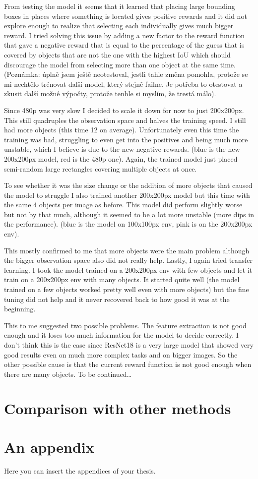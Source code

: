 \documentclass[
  digital,     %
  oneside,     %
  nosansbold,  %
  nocolorbold, %
  lof,         %
  lot,         %
]{fithesis4}
\begin{document}
From testing the model it seems that it learned that placing large bounding boxes in places where something is located gives positive rewards and it did not explore enough to realize that selecting each individually gives much bigger reward. I tried solving this issue by adding a new factor to the reward function that gave a negative reward that is equal to the percentage of the guess that is covered by objects that are not the one with the highest IoU which should discourage the model from selecting more than one object at the same time. (Poznámka: úplně jsem ještě neotestoval, jestli tahle změna pomohla, protože se mi nechtělo trénovat další model, který stejně failne. Je potřeba to otestovat a zkusit další možné výpočty, protože tenhle si myslím, že trestá málo).

Since 480p was very slow I decided to scale it down for now to just 200x200px. This still quadruples the observation space and halves the training speed. I still had more objects (this time 12 on average). Unfortunately even this time the training was bad, struggling to even get into the positives and being much more unstable, which I believe is due to the new negative rewards. (blue is the new 200x200px model, red is the 480p one). Again, the trained model just placed semi-random large rectangles covering multiple objects at once.

To see whether it was the size change or the addition of more objects that caused the model to struggle I also trained another 200x200px model but this time with the same 4 objects per image as before. This model did perform slightly worse but not by that much, although it seemed to be a lot more unstable (more dips in the performance). (blue is the model on 100x100px env, pink is on the 200x200px env).

This mostly confirmed to me that more objects were the main problem although the bigger observation space also did not really help. Lastly, I again tried transfer learning. I took the model trained on a 200x200px env with few objects and let it train on a 200x200px env with many objects. It started quite well (the model trained on a few objects worked pretty well even with more objects) but the fine tuning did not help and it never recovered back to how good it was at the beginning.

This to me suggested two possible problems. The feature extraction is not good enough and it loses too much information for the model to decide correctly. I don't think this is the case since ResNet18 is a very large model that showed very good results even on much more complex tasks and on bigger images. So the other possible cause is that the current reward function is not good enough when there are many objects.
	To be continued…


\chapter{Comparison with other methods}


\printbibliography[heading=bibintoc] %


\appendix %
\chapter{An appendix}
Here you can insert the appendices of your thesis.
\end{document}

